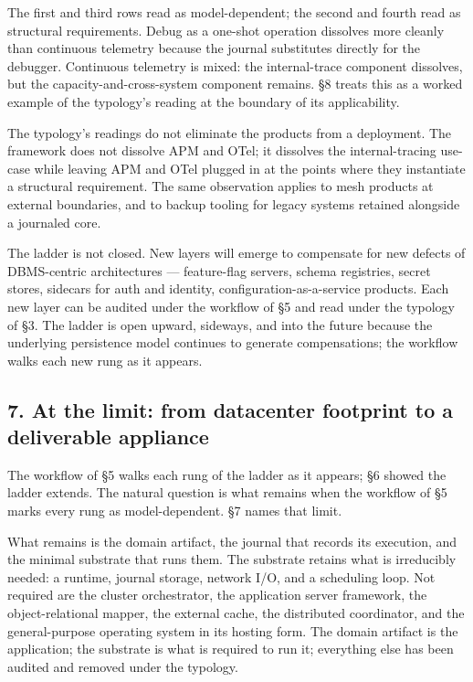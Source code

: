 \documentclass[
]{article}
\begin{document}
The first and third rows read as model-dependent; the second and fourth
read as structural requirements. Debug as a one-shot operation dissolves
more cleanly than continuous telemetry because the journal substitutes
directly for the debugger. Continuous telemetry is mixed: the
internal-trace component dissolves, but the capacity-and-cross-system
component remains. §8 treats this as a worked example of the typology's
reading at the boundary of its applicability.

The typology's readings do not eliminate the products from a deployment.
The framework does not dissolve APM and OTel; it dissolves the
internal-tracing use-case while leaving APM and OTel plugged in at the
points where they instantiate a structural requirement. The same
observation applies to mesh products at external boundaries, and to
backup tooling for legacy systems retained alongside a journaled core.

The ladder is not closed. New layers will emerge to compensate for new
defects of DBMS-centric architectures --- feature-flag servers, schema
registries, secret stores, sidecars for auth and identity,
configuration-as-a-service products. Each new layer can be audited under
the workflow of §5 and read under the typology of §3. The ladder is open
upward, sideways, and into the future because the underlying persistence
model continues to generate compensations; the workflow walks each new
rung as it appears.

\subsection{7. At the limit: from datacenter footprint to a deliverable
appliance}\label{at-the-limit-from-datacenter-footprint-to-a-deliverable-appliance}

The workflow of §5 walks each rung of the ladder as it appears; §6
showed the ladder extends. The natural question is what remains when the
workflow of §5 marks every rung as model-dependent. §7 names that limit.

What remains is the domain artifact, the journal that records its
execution, and the minimal substrate that runs them. The substrate
retains what is irreducibly needed: a runtime, journal storage, network
I/O, and a scheduling loop. Not required are the cluster orchestrator,
the application server framework, the object-relational mapper, the
external cache, the distributed coordinator, and the general-purpose
operating system in its hosting form. The domain artifact is the
application; the substrate is what is required to run it; everything
else has been audited and removed under the typology.
\end{document}
